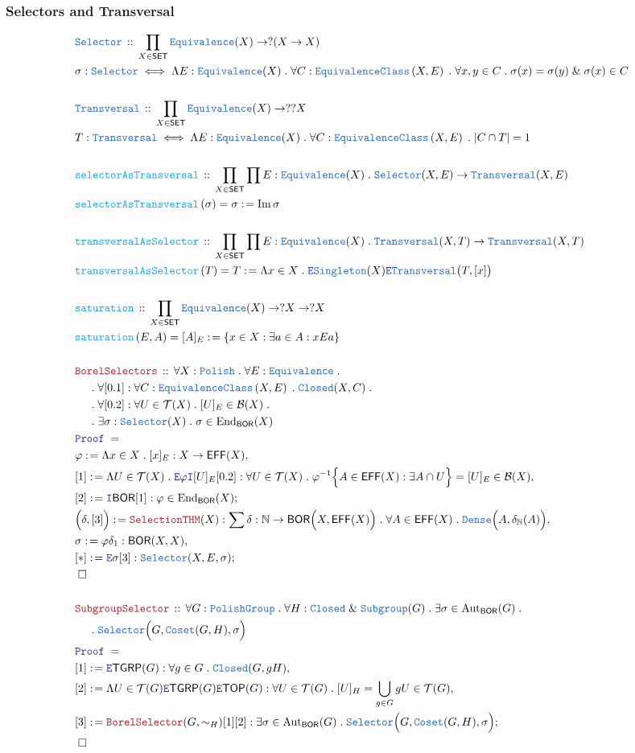 \documentclass[12pt]{scrartcl}
\newcommand{\TYPE}[1]{\textcolor{NavyBlue}{\mathtt{#1}}}
\newcommand{\FUNC}[1]{\textcolor{Cerulean}{\mathtt{#1}}}
\newcommand{\LOGIC}[1]{\textcolor{Blue}{\mathtt{#1}}}
\newcommand{\THM}[1]{\textcolor{Maroon}{\mathtt{#1}}}
\renewcommand{\.}{\; . \;}
\newcommand{\de}{: \kern 0.1pc =}
\newcommand{\Act}[1]{\left( #1 \right)}
\newcommand{\Theorem}[2]{& \THM{#1} \, :: \, #2 \\ & \Proof = \\ }
\newcommand{\DeclareType}[2]{& \TYPE{#1} \, :: \, #2 \\}
\newcommand{\DefineType}[3]{& #1 : \TYPE{#2} \iff #3 \\}
\newcommand{\DeclareFunc}[2]{& \FUNC{#1} \, :: \, #2 \\}
\newcommand{\DefineNamedFunc}[4]{&  \FUNC{#1}\Act{#2} = #3 \de #4 \\}
\newcommand{\NewLine}{\\ & \kern 1pc}
\newcommand{\Page}[1]{ \begin{align*} #1 \end{align*}   }
\renewcommand{\And}{\; \& \;}
\newcommand{\Nat}{\mathbb{N} }
\DeclareMathOperator*{\im}{Im}
\newcommand{\Eq}{\TYPE{Equivalence}}
\newcommand{\EqClass}[1]{\TYPE{EquivalenceClass}\left( #1 \right)}
\newcommand{\End}{\mathrm{End}}
\newcommand{\Aut}{\mathrm{Aut}}
\newcommand{\Say}[3]{& #1 \de #2 : #3, \\}
\newcommand{\Conclude}[3]{& #1 \de #2 : #3; \\}
\newcommand{\Intro}{\LOGIC{I}}
\newcommand{\Elim}{\LOGIC{E}}
\newcommand{\QED}{\; \square}
\newcommand{\EndProof}{& \QED \\}
\newcommand{\Proof}{\LOGIC{Proof} \; }
\newcommand{\B}{\mathcal{B}}
\newcommand{\SET}{\mathsf{SET}}
\newcommand{\Dense}{\TYPE{Dense}}
\newcommand{\Closed}{\TYPE{Closed}}
\newcommand{\TOP}{\mathsf{TOP}}
\newcommand{\T}{\mathcal{T}}
\newcommand{\Polish}{\TYPE{Polish}}
\newcommand{\BOR}{\mathsf{BOR}}
\newcommand{\Effros}{\mathsf{EFF}}
\newcommand{\PG}{\TYPE{PolishGroup}}
\newcommand{\Selector}{\TYPE{Selector}}
\newcommand{\Transversal}{\TYPE{Transversal}}
\newcommand{\TGRP}{\mathsf{TGRP}}
\begin{document}
\subsubsection{Selectors and Transversal}
\Page{
	\DeclareType{Selector}{\prod_{X \in \SET} \Eq(X) \to ?(X \to X)}
	\DefineType{\sigma}{Selector}
	{
		\Lambda E : \Eq(X)	 \.	
		\forall  C : \EqClass{X,E} \.
		\forall x,y \in C \.
		\sigma(x) = \sigma(y)
		\And
		\sigma(x) \in C 	
	}
	\\
	\DeclareType{Transversal}{\prod_{X \in \SET} \Eq(X) \to ??X}
	\DefineType{T}{Transversal}
	{
		\Lambda E : \Eq(X) \. 
		\forall C : \EqClass{X,E} \.
		|C  \cap T| = 1	
	}
	\\
	\DeclareFunc{selectorAsTransversal}{
		\prod_{X \in \SET} 
		\prod E : \Eq(X) \.
		\Selector(X,E) \to \Transversal(X,E)
	}
	\DefineNamedFunc{selectorAsTransversal}{\sigma}{\sigma}{\im \sigma}
	\\
	\DeclareFunc{transversalAsSelector}{
		\prod_{X \in \SET} 
		\prod E : \Eq(X) \.
		\Transversal(X,T) \to \Transversal(X,T)
	}
	\DefineNamedFunc{transversalAsSelector}{T}{T}{
		\Lambda x \in X \. 		
		\Elim \TYPE{Singleton}(X) 
		\Elim \TYPE{Transversal}\big(T,[x]\big)
	}
	\\
	\DeclareFunc{saturation}
	{
		\prod_{X \in \SET}
		\Eq(X) \to ?X \to ?X
	}
	\DefineNamedFunc{saturation}{E,A}{[A]_E}
	{
		\{
			x \in X : \exists a \in A : xEa
		\}	
	}
	\\
	\Theorem{BorelSelectors}
	{
		\forall X : \Polish \.	
		\forall E : \Eq \. \NewLine \.
		\forall [0.1] : \forall C : \EqClass{X,E} \. \Closed(X,C) \.  \NewLine \.
		\forall [0.2] : \forall U \in \T(X) \. [U]_E \in \B(X) \. \NewLine \.
		\exists \sigma : \Selector(X) \.
		\sigma \in \End_\BOR(X)
	}
	\Say{\varphi}
	{
		\Lambda x \in X \.
		[x]_E 	
	}{
		X \to \Effros(X)
	}
	\Say{[1]}
	{
		\Lambda U \in \T(X) \. 
		\Elim \varphi \Intro [U]_E
		[0.2]
	}
	{
		\forall U \in \T(X) \.
		\varphi^{-1}\Big\{ A \in \Effros(X) : \exists A \cap U    \Big\} = [U]_E \in \B(X)
	}
	\Conclude{[2]}{\Intro \BOR [1]}
	{
		\varphi \in \End_\BOR(X)	
	}
	\Say{\Big(\delta,[3]\Big)}
	{
		\THM{SelectionTHM}(X)
	}
	{
		\sum \delta : \Nat \to \BOR\Big(X,\Effros(X)\Big) \.
		\forall A \in \Effros(X) \. \Dense\Big(A, \delta_\Nat(A) \Big)
	}
	\Say{\sigma}{\varphi \delta_1}{\BOR(X,X)}
	\Conclude{[*]}{\Elim \sigma [3]}{\Selector(X,E,\sigma) }
	\EndProof
	\\
	\Theorem{SubgroupSelector}
	{
		\forall G : \PG \.
		\forall H : \Closed \And \TYPE{Subgroup}(G) \.
		\exists \sigma  \in \Aut_\BOR(G) \. \NewLine \.
		\Selector\Big(G,\TYPE{Coset}(G,H),\sigma\Big)
	}
	\Say{[1]}{\Elim \TGRP (G)}{\forall g \in G \. \Closed(G,gH)}
	\Say{[2]}{\Lambda U \in \T(G) \Elim \TGRP (G) \Elim \TOP(G)}
	{
		\forall U \in \T(G) \.
		[U]_H = \bigcup_{g \in G} gU \in \T(G)
	}
	\Conclude{[3]}{\THM{BorelSelector}(G,\sim_H)[1][2]}
	{
		\exists \sigma  \in \Aut_\BOR(G) \.
		\Selector\Big(G,\TYPE{Coset}(G,H),\sigma\Big)
	}
	\EndProof
}
\newpage
\end{document}
